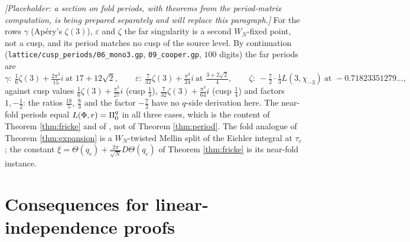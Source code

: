\documentclass[11pt]{amsart}
\theoremstyle{definition}
\theoremstyle{remark}
\begin{document}
\emph{[Placeholder: a section on fold periods, with theorems from the period-matrix computation, is being prepared separately and will replace this paragraph.]} For the rows $\gamma$ (Ap\'ery's $\zeta(3)$), $\varepsilon$ and $\zeta$ the far singularity is a second $W_N$-fixed point, not a cusp, and its period matches no cusp of the source level. By continuation (\texttt{lattice/cusp\_periods/06\_mono3.gp}, \texttt{09\_cooper.gp}, $100$ digits) the far periods are
$$\gamma:\ \tfrac16\zeta(3)+\tfrac{2\pi^3}{15}i\ \text{at }17+12\sqrt2,\qquad \varepsilon:\ \tfrac7{32}\zeta(3)+\tfrac{\pi^3}{24}i\ \text{at }\tfrac{3+2\sqrt2}4,\qquad \zeta:\ -\tfrac72\cdot\tfrac13L(3,\chi_{-3})\ \text{at }-0.71823351279\ldots,$$
against cusp values $\tfrac16\zeta(3)+\tfrac{\pi^3}{27}i$ (cusp $\tfrac13$), $\tfrac7{32}\zeta(3)+\tfrac{\pi^3}{64}i$ (cusp $\tfrac14$) and factors $1,-\tfrac12$: the ratios $\tfrac{18}5$, $\tfrac83$ and the factor $-\tfrac72$ have no $q$-side derivation here. The near-fold periods equal $L(\Phi,r)=\Pi^{q}_0$ in all three cases, which is the content of Theorem \ref{thm:fricke} and of \cite[Thm.~B]{ProjSources}, not of Theorem \ref{thm:period}. The fold analogue of Theorem \ref{thm:expansion} is a $W_N$-twisted Mellin split of the Eichler integral at $\tau_c$; the constant $\xi=\Theta(q_c)+\frac{2\pi}{\sqrt N}D\Theta(q_c)$ of Theorem \ref{thm:fricke} is its near-fold instance.

\section{Consequences for linear-independence proofs}\label{sec:dioph}
\end{document}
